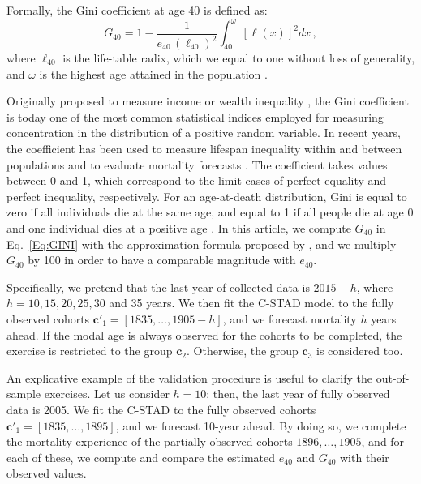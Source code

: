 \documentclass[11pt, a4paper]{article}
\begin{document}
Formally, the Gini coefficient at age 40 is defined as:
%
\begin{equation}\label{Eq:GINI}
G_{40} = 1 - \frac{1}{e_{40}\,\left(\ell_{40}\right)^2} \int_{40}^{\omega} \left[\ell(x)\right]^2 dx \, ,
\end{equation}
%
where $\ell_{40}$ is the life-table radix, which we equal to one without loss of generality, and $\omega$ is the highest age attained in the population \citep{hanada1983formula,shkolnikov2003gini}.

Originally proposed to measure income or wealth inequality \citep{gini1912variabilita,gini1914sulla}, the Gini coefficient is today one of the most common statistical indices employed for measuring concentration in the distribution of a positive random variable. In recent years, the coefficient has been used to measure lifespan inequality within and between populations \cite[see, e.g.,][]{shkolnikov2003gini,smits2009length,van2013perturbation,gigliarano2017longevity} and to evaluate mortality forecasts \citep{diaz2018mortality,basellini2019modelling}. The coefficient takes values between 0 and 1, which correspond to the limit cases of perfect equality and perfect inequality, respectively. For an age-at-death distribution, Gini is equal to zero if all individuals die at the same age, and equal to 1 if all people die at age 0 and one individual dies at a positive age \citep{shkolnikov2003gini}. In this article, we compute $G_{40}$ in Eq.~\eqref{Eq:GINI} with the approximation formula proposed by \cite{shkolnikov2003gini}, and we multiply $G_{40}$ by 100 in order to have a comparable magnitude with $e_{40}$.

Specifically, we pretend that the last year of collected data is $2015 - h$, where $h=10,15,20,25,30$ and 35 years. We then fit the C-STAD model to the fully observed cohorts $\bm{c}'_1=\left[1835,\dots,1905-h\right]$, and we forecast mortality $h$ years ahead. If the modal age is always observed for the cohorts to be completed, the exercise is restricted to the group $\bm{c}_{2}$. Otherwise, the group $\bm{c}_{3}$ is considered too. 

An explicative example of the validation procedure is useful to clarify the out-of-sample exercises. Let us consider $h=10$: then, the last year of fully observed data is 2005. We fit the C-STAD to the fully observed cohorts $\bm{c}'_1=\left[1835,\dots,1895\right]$, and we forecast 10-year ahead. By doing so, we complete the mortality experience of the partially observed cohorts $1896,\ldots,1905$, and for each of these, we compute and compare the estimated $e_{40}$ and $G_{40}$ with their observed values. 
\end{document}
